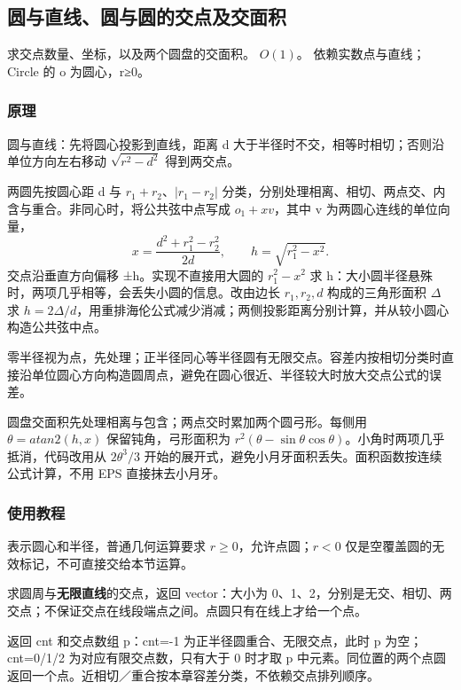 \subsection{圆与直线、圆与圆的交点及交面积}
\label{geo:circle}
\AlgorithmInfo
    {求交点数量、坐标，以及两个圆盘的交面积。}
    {$O(1)$。}
    {依赖实数点与直线；Circle 的 o 为圆心，r≥0。}
\subsubsection*{原理}

圆与直线：先将圆心投影到直线，距离 d 大于半径时不交，相等时相切；否则沿单位方向左右移动 $\sqrt{r^2-d^2}$ 得到两交点。

两圆先按圆心距 d 与 $r_1+r_2$、$|r_1-r_2|$ 分类，分别处理相离、相切、两点交、内含与重合。非同心时，将公共弦中点写成 $o_1+xv$，其中 v 为两圆心连线的单位向量，
\[
 x=\frac{d^2+r_1^2-r_2^2}{2d},\qquad h=\sqrt{r_1^2-x^2}.
\]
交点沿垂直方向偏移 ±h。实现不直接用大圆的 $r_1^2-x^2$ 求 h：大小圆半径悬殊时，两项几乎相等，会丢失小圆的信息。改由边长 $r_1,r_2,d$ 构成的三角形面积 $\Delta$ 求 $h=2\Delta/d$，用重排海伦公式减少消减；两侧投影距离分别计算，并从较小圆心构造公共弦中点。

零半径视为点，先处理；正半径同心等半径圆有无限交点。容差内按相切分类时直接沿单位圆心方向构造圆周点，避免在圆心很近、半径较大时放大交点公式的误差。

圆盘交面积先处理相离与包含；两点交时累加两个圆弓形。每侧用 $\theta=atan2(h,x)$ 保留钝角，弓形面积为 $r^2(\theta-\sin\theta\cos\theta)$。小角时两项几乎抵消，代码改用从 $2\theta^3/3$ 开始的展开式，避免小月牙面积丢失。面积函数按连续公式计算，不用 EPS 直接抹去小月牙。

\subsubsection*{使用教程}
 表示圆心和半径，普通几何运算要求 $r\ge0$，允许点圆；$r<0$ 仅是空覆盖圆的无效标记，不可直接交给本节运算。

 求圆周与\textbf{无限直线}的交点，返回 vector：大小为 0、1、2，分别是无交、相切、两交点；不保证交点在线段端点之间。点圆只有在线上才给一个点。

 返回 cnt 和交点数组 p：cnt=-1 为正半径圆重合、无限交点，此时 p 为空；cnt=0/1/2 为对应有限交点数，只有大于 0 时才取 p 中元素。同位置的两个点圆返回一个点。近相切／重合按本章容差分类，不依赖交点排列顺序。


